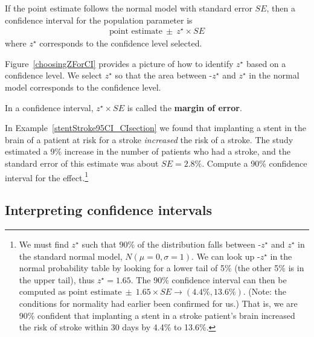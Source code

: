 \begin{termBox}{
If the point estimate follows the normal model with standard error $SE$, then a confidence interval for the population parameter is
\begin{eqnarray*}
\text{point estimate}\ \pm\ z^{\star} \times SE
\end{eqnarray*}
where $z^{\star}$ corresponds to the confidence level selected.}
\end{termBox}

Figure~\ref{choosingZForCI} provides a picture of how to identify $z^{\star}$ based on a confidence level. We select $z^{\star}$ so that the area between -$z^{\star}$ and $z^{\star}$ in the normal model corresponds to the confidence level. 

\begin{termBox}{
\label{marginOfErrorTermBox}In a confidence interval, $z^{\star}\times SE$ is called the \textbf{margin of error}.}
\end{termBox}

\textA{\pagebreak}

\begin{exercise} \label{find90CIForRun10AgeExercise}
In Example~\ref{stentStroke95CI_CIsection} we found that implanting a stent in the brain of a patient at risk for a stroke \emph{increased} the risk of a stroke. The study estimated a 9\% increase in the number of patients who had a stroke, and the standard error of this estimate was about $SE = 2.8\%$. Compute a 90\% confidence interval for the effect.\footnote{We must find $z^{\star}$ such that 90\% of the distribution falls between -$z^{\star}$ and $z^{\star}$ in the standard normal model, $N(\mu=0, \sigma=1)$. We can look up -$z^{\star}$ in the normal probability table by looking for a lower tail of 5\% (the other 5\% is in the upper tail), thus $z^{\star}=1.65$. The 90\% confidence interval can then be computed as $\text{point estimate}\ \pm\ 1.65\times SE \to (4.4\%, 13.6\%)$. (Note: the conditions for normality had earlier been confirmed for us.) That is, we are 90\% confident that implanting a stent in a stroke patient's brain increased the risk of stroke within 30 days by 4.4\% to 13.6\%.}
\end{exercise}

\subsection{Interpreting confidence intervals}
\label{interpretingCIs}

